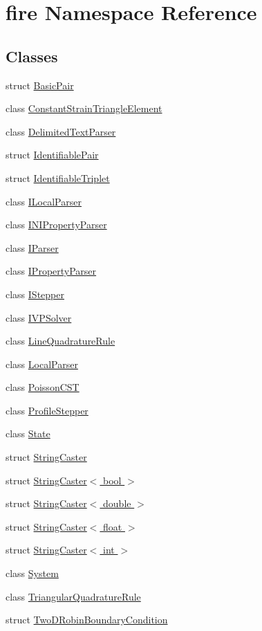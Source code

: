 \hypertarget{a00198}{}\section{fire Namespace Reference}
\label{a00198}
\subsection*{Classes}
\begin{DoxyCompactItemize}
\item 
struct \hyperlink{a00777}{Basic\+Pair}
\item 
class \hyperlink{a00773}{Constant\+Strain\+Triangle\+Element}
\item 
class \hyperlink{a00809}{Delimited\+Text\+Parser}
\item 
struct \hyperlink{a00781}{Identifiable\+Pair}
\item 
struct \hyperlink{a00785}{Identifiable\+Triplet}
\item 
class \hyperlink{a00813}{I\+Local\+Parser}
\item 
class \hyperlink{a00817}{I\+N\+I\+Property\+Parser}
\item 
class \hyperlink{a00821}{I\+Parser}
\item 
class \hyperlink{a00825}{I\+Property\+Parser}
\item 
class \hyperlink{a00797}{I\+Stepper}
\item 
class \hyperlink{a00873}{I\+V\+P\+Solver}
\item 
class \hyperlink{a00865}{Line\+Quadrature\+Rule}
\item 
class \hyperlink{a00829}{Local\+Parser}
\item 
class \hyperlink{a00793}{Poisson\+C\+ST}
\item 
class \hyperlink{a00801}{Profile\+Stepper}
\item 
class \hyperlink{a00877}{State}
\item 
struct \hyperlink{a00833}{String\+Caster}
\item 
struct \hyperlink{a00849}{String\+Caster$<$ bool $>$}
\item 
struct \hyperlink{a00837}{String\+Caster$<$ double $>$}
\item 
struct \hyperlink{a00841}{String\+Caster$<$ float $>$}
\item 
struct \hyperlink{a00845}{String\+Caster$<$ int $>$}
\item 
class \hyperlink{a00805}{System}
\item 
class \hyperlink{a00869}{Triangular\+Quadrature\+Rule}
\item 
struct \hyperlink{a00789}{Two\+D\+Robin\+Boundary\+Condition}
\end{DoxyCompactItemize}
